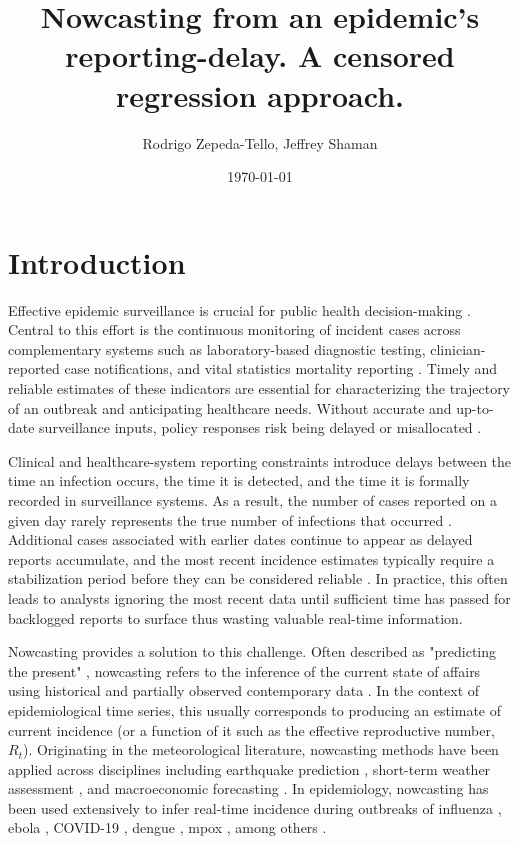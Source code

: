 \documentclass[12pt]{article}
\title{Nowcasting from an epidemic's reporting-delay. A censored regression approach.}
\author{Rodrigo Zepeda-Tello, Jeffrey Shaman}
\date{\today{}}
\begin{document}
\maketitle

\section{Introduction}

Effective epidemic surveillance is crucial for public health decision-making \cite{world2023future, shen2025progress}. Central to this effort is the continuous monitoring of incident cases across complementary systems such as laboratory-based diagnostic testing, clinician-reported case notifications, and vital statistics mortality reporting \cite{ibrahim2020epidemiologic}. Timely and reliable estimates of these indicators are essential for characterizing the trajectory of an outbreak and anticipating healthcare needs. Without accurate and up-to-date surveillance inputs, policy responses risk being delayed or misallocated \cite{shen2025progress, villela2022importance}.

Clinical and healthcare-system reporting constraints introduce delays between the time an infection occurs, the time it is detected, and the time it is formally recorded in surveillance systems. As a result, the number of cases reported on a given day rarely represents the true number of infections that occurred \cite{jajosky2004evaluation, swaan2018timeliness, marinovic2015quantifying}. Additional cases associated with earlier dates continue to appear as delayed reports accumulate, and the most recent incidence estimates typically require a stabilization period before they can be considered reliable \cite{center2004morbidity}. In practice, this often leads to analysts ignoring the most recent data until sufficient time has passed for backlogged reports to surface thus wasting valuable real-time information.

Nowcasting provides a solution to this challenge. Often described as "predicting the present" \cite{scott2014predicting}, nowcasting refers to the inference of the current state of affairs using historical and partially observed contemporary data \cite{wu2021nowcasting}. In the context of epidemiological time series, this usually corresponds to producing an estimate of current incidence (or a function of it such as the effective reproductive number, $R_t$). Originating in the meteorological literature, nowcasting methods have been applied across disciplines including earthquake prediction \cite{rundle2016nowcasting}, short-term weather assessment \cite{camporeale2019challenge}, and macroeconomic forecasting \cite{bok2018macroeconomic}. In epidemiology, nowcasting has been used extensively to infer real-time incidence during outbreaks of influenza \cite{he2022nowcasting, preis2014adaptive, spreco2018evaluation}, ebola \cite{tariq2025nowcast}, COVID-19 \cite{greene2021nowcasting, birrell2021real, albani2022nowcasting}, dengue \cite{codeco2018infodengue, mcgough2020nowcasting}, mpox \cite{charniga2024nowcasting, rohrer2025nowcasting}, among others \cite{mellor2025application, menkir2021nowcasting}.
\end{document}
